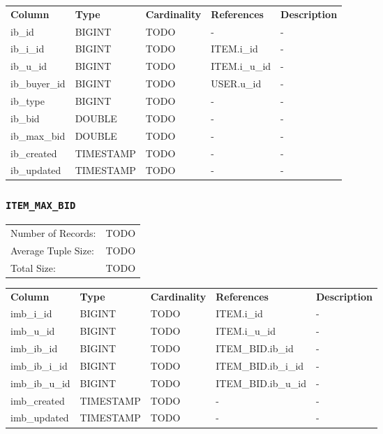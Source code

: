 \documentclass[a4paper,10pt]{article}
\begin{document}
\noindent \begin{tabular*}{\textwidth}{@{\extracolsep{\fill}} lllll}
\textbf{Column} & \textbf{Type} & \textbf{Cardinality} & \textbf{References} & \textbf{Description} \\
ib\_id             & BIGINT     & TODO & -               & - \\
ib\_i\_id          & BIGINT     & TODO & ITEM.i\_id      & - \\
ib\_u\_id          & BIGINT     & TODO & ITEM.i\_u\_id   & - \\
ib\_buyer\_id      & BIGINT     & TODO & USER.u\_id      & - \\
ib\_type           & BIGINT     & TODO & -               & - \\
ib\_bid            & DOUBLE     & TODO & -               & - \\
ib\_max\_bid       & DOUBLE     & TODO & -               & - \\
ib\_created        & TIMESTAMP  & TODO & -               & - \\
ib\_updated        & TIMESTAMP  & TODO & -               & - \\
\end{tabular*}

\subsubsection{\texttt{ITEM\_MAX\_BID}}

\begin{tabular}{ll}
Number of Records:      & TODO \\
Average Tuple Size:     & TODO \\
Total Size:             & TODO \\
\end{tabular}

\vspace*{0.1in}

\noindent \begin{tabular*}{\textwidth}{@{\extracolsep{\fill}} lllll}
\textbf{Column} & \textbf{Type} & \textbf{Cardinality} & \textbf{References} & \textbf{Description} \\
imb\_i\_id         & BIGINT     & TODO & ITEM.i\_id      & - \\
imb\_u\_id         & BIGINT     & TODO & ITEM.i\_u\_id   & - \\
imb\_ib\_id        & BIGINT     & TODO & ITEM\_BID.ib\_id & - \\
imb\_ib\_i\_id     & BIGINT     & TODO & ITEM\_BID.ib\_i\_id & - \\
imb\_ib\_u\_id     & BIGINT     & TODO & ITEM\_BID.ib\_u\_id & - \\
imb\_created       & TIMESTAMP  & TODO & -               & - \\
imb\_updated       & TIMESTAMP  & TODO & -               & - \\
\end{tabular*}
\end{document}

